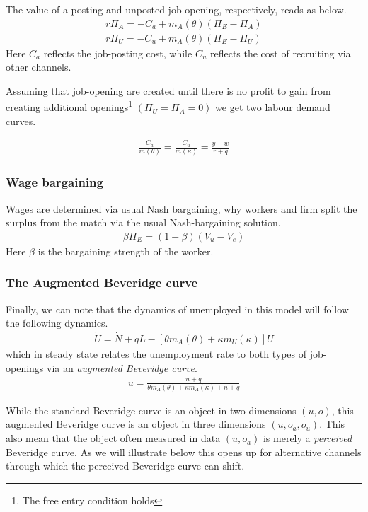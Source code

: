 \documentclass[11pt,article]{memoir}
\begin{document}
The value of a posting and unposted job-opening, respectively, reads as below. 
\begin{align}
r \Pi_A= -C_a+ m_A \left( \theta \right) \left( \Pi_E - \Pi_A \right) \\
r \Pi_U= -C_u+ m_A \left( \theta \right) \left( \Pi_E - \Pi_U \right) 
\end{align}
 Here $C_a$ reflects the job-posting cost, while $C_u$ reflects the cost of recruiting via other channels.

Assuming that job-opening are created until there is no profit to gain from creating additional openings\footnote{The free entry condition holds} $(\Pi_U=\Pi_A=0)$ we get two labour demand curves.

\begin{align}
\frac{C_a}{m(\theta)}=\frac{C_u}{m(\kappa)}=\frac{y-w}{r+q}
\label{eq:labourdemand}
\end{align}

\subsubsection{Wage bargaining}
Wages are determined via usual Nash bargaining, why workers and firm split the surplus from the match via the usual Nash-bargaining solution.
\begin{align}
\beta \Pi_E =\left( 1 -\beta \right) \left( V_u - V_e \right)
\end{align}
Here $\beta$ is the bargaining strength of the worker.

\subsubsection{The Augmented Beveridge curve}
Finally, we can note that the dynamics of unemployed in this model will follow the following dynamics.
\begin{align}
\dot{U}=\dot{N}+qL-\left[ \theta m_A \left( \theta \right) +\kappa m_U \left( \kappa \right) \right] U
\end{align}
which in steady state relates the unemployment rate to both types of job-openings via an \emph{augmented Beveridge curve}. 
\begin{align}
u=\frac{n+q}{\theta m_A \left( \theta \right)+\kappa m_A \left( \kappa \right)+n+q}
\end{align}

While the standard Beveridge curve is an object in two dimensions $(u, o)$, this augmented Beveridge curve is an object in three dimensions $(u, o_a, o_u)$. This also mean that the object often measured in data $(u, o_a)$ is merely a \emph{perceived} Beveridge curve. As we will illustrate below this opens up for alternative channels through which the perceived Beveridge curve can shift.
\end{document}
